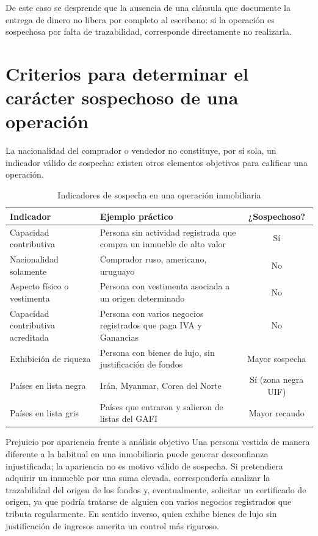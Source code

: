 \documentclass[12pt,oneside]{book}
\begin{document}
De este caso se desprende que la ausencia de una cláusula que documente la entrega de dinero no libera por completo al escribano: si la operación es sospechosa por falta de trazabilidad, corresponde directamente no realizarla.

\section{Criterios para determinar el carácter sospechoso de una operación}

La nacionalidad del comprador o vendedor no constituye, por sí sola, un indicador válido de sospecha: existen otros elementos objetivos para calificar una operación.

\begin{table}[H]
\centering
\caption{Indicadores de sospecha en una operación inmobiliaria}
\renewcommand{\arraystretch}{1.2}
\begin{tabularx}{\textwidth}{>{\raggedright\arraybackslash}X>{\raggedright\arraybackslash}Xc}
\toprule
\textbf{Indicador} & \textbf{Ejemplo práctico} & \textbf{¿Sospechoso?} \\
\midrule
Capacidad contributiva & Persona sin actividad registrada que compra un inmueble de alto valor & Sí \\
Nacionalidad solamente & Comprador ruso, americano, uruguayo & No \\
Aspecto físico o vestimenta & Persona con vestimenta asociada a un origen determinado & No \\
Capacidad contributiva acreditada & Persona con varios negocios registrados que paga IVA y Ganancias & No \\
Exhibición de riqueza & Persona con bienes de lujo, sin justificación de fondos & Mayor sospecha \\
Países en lista negra & Irán, Myanmar, Corea del Norte & Sí (zona negra UIF) \\
Países en lista gris & Países que entraron y salieron de listas del GAFI & Mayor recaudo \\
\bottomrule
\end{tabularx}
\end{table}

\begin{example}{Prejuicio por apariencia frente a análisis objetivo}
Una persona vestida de manera diferente a la habitual en una inmobiliaria puede generar desconfianza injustificada; la apariencia no es motivo válido de sospecha. Si pretendiera adquirir un inmueble por una suma elevada, correspondería analizar la trazabilidad del origen de los fondos y, eventualmente, solicitar un certificado de origen, ya que podría tratarse de alguien con varios negocios registrados que tributa regularmente. En sentido inverso, quien exhibe bienes de lujo sin justificación de ingresos amerita un control más riguroso.
\end{example}
\end{document}
